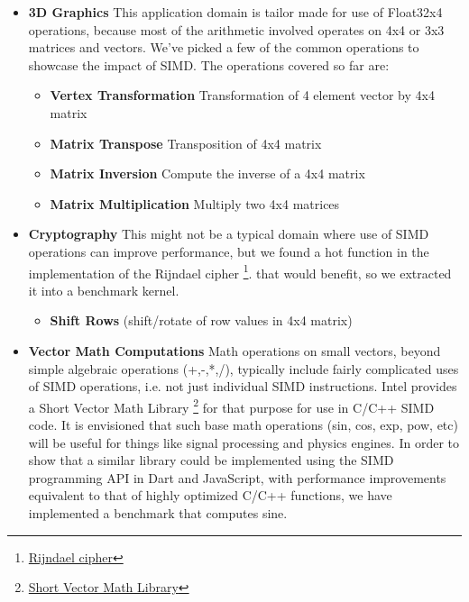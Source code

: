 \documentclass[preprint]{sigplanconf}
\begin{document}
\begin{itemize}
\item
\textbf{3D Graphics}
This application domain is tailor made for use of Float32x4 operations, because
most of the arithmetic involved operates on 4x4 or 3x3 matrices and vectors.
We've picked a few of the common operations to showcase the impact of SIMD.
%
The operations covered so far are:
\begin{itemize}
\item
\textbf{Vertex Transformation} Transformation of 4 element vector by 4x4 matrix
\item \textbf{Matrix Transpose} Transposition of 4x4 matrix
\item \textbf{Matrix Inversion} Compute the inverse of a 4x4 matrix
\item \textbf{Matrix Multiplication} Multiply two 4x4 matrices
\end{itemize}

\item \textbf{Cryptography}
This might not be a typical domain where use of SIMD operations can improve
performance, but we found a hot function in the implementation of the Rijndael
cipher
\footnote{\href{http://csrc.nist.gov/archive/aes/rijndael/Rijndael-ammended.pdf}
{Rijndael cipher}}. that would benefit, so we extracted it into a benchmark
kernel.

\begin{itemize}
\item \textbf{Shift Rows} (shift/rotate of row values in 4x4 matrix)
\end{itemize}

\item
\textbf{Vector Math Computations}
Math operations on small vectors, beyond simple algebraic operations (+,-,*,/),
typically include fairly complicated uses of SIMD operations, i.e. not just
individual SIMD instructions.  Intel provides a
Short Vector Math Library
\footnote{
\href{http://software.intel.com/sites/products/documentation/doclib/iss/2013/compiler/cpp-lin/index.htm\#GUID-7580634E-88D9-4B67-94ED-8472CCC5AF68.htm}
{Short Vector Math Library}} for that purpose for use in C/C++ SIMD code.
It is envisioned that such base math operations (sin, cos, exp, pow, etc) will
be useful for things like signal processing and physics engines.  In order to
show that a similar library could be implemented using the SIMD programming
API in Dart and JavaScript, with performance improvements equivalent to that of
highly optimized C/C++ functions, we have implemented a benchmark that computes
sine.


\end{itemize}
\end{document}
